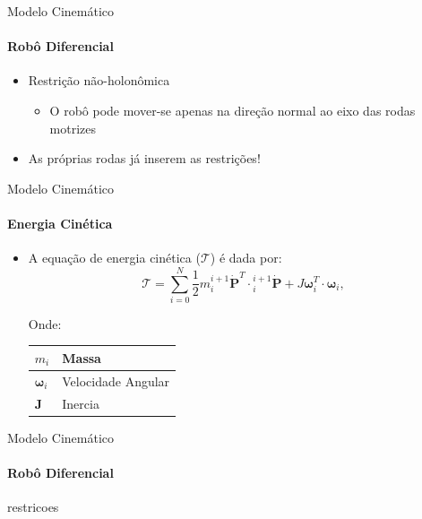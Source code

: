 \documentclass{beamer}
\begin{document}
\begin{frame}{Modelo Cinemático}
    \framesubtitle{Robô Diferencial}
    \begin{itemize}
        \item Restrição não-holonômica
        \begin{itemize}
            \item O robô pode mover-se apenas na direção normal ao eixo das rodas motrizes
        \end{itemize}
    \item As próprias rodas já inserem as restrições!
    \end{itemize}
    \centering
    
\end{frame}

\begin{frame}{Modelo Cinemático}
    \framesubtitle{Energia Cinética}
    \begin{itemize}
        \item A equação de energia cinética ($\mathcal{T}$) é dada por:
        \begin{equation}
        \mathcal{T} = \sum\limits_{i=0}^{N} \frac{1}{2} m {}_{i}^{i+1} \dot{\mathbf{P}}^T \cdot {}_{i}^{i+1}\dot{\mathbf{P}}+ J\mathbf{\omega}_i^T\cdot \mathbf{\omega}_i,
        \end{equation}
        \newline

        Onde:
        \newline
        
        \begin{tabular}{l | l}
            \hline
            $m_i$ & Massa \\ \hline
            $\mathbf{\omega}_i$ & Velocidade Angular \\ \hline
            $\mathbf{J}$ & Inercia \\ \hline
        \end{tabular}

    \end{itemize}
\end{frame}


\begin{frame}{Modelo Cinemático}
    \framesubtitle{Robô Diferencial}
    restricoes
    
\end{frame}
\end{document}
